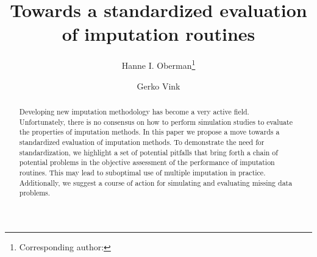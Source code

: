 \documentclass[bimj,fleqn]{w-art}
\theoremstyle{plain}
\theoremstyle{definition}
\begin{document}

\title[Standardized evaluation]{Towards a standardized evaluation of imputation routines}
\author[Oberman]{Hanne I. Oberman\footnote{Corresponding author: {}}} 
\address[\inst{1}]{Departement of Methodology \& Statistics, Padualaan 14, 3584 CH Utrecht, The Netherlands}
\author[Vink]{Gerko Vink}
   

\begin{abstract}
Developing new imputation methodology has become a very active field. Unfortunately, there is no consensus on how to perform simulation studies to evaluate the properties of imputation methods. In this paper we propose a move towards a standardized evaluation of imputation methods. To demonstrate the need for standardization, we highlight a set of potential pitfalls that bring forth a chain of potential problems in the objective assessment of the performance of imputation routines. This may lead to suboptimal use of multiple imputation in practice. Additionally, we suggest a course of action for simulating and evaluating missing data problems.
\end{abstract}



\maketitle                   %



\end{document}
